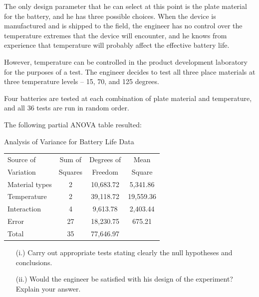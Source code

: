 The only design parameter that he can select at this point is the plate material for the battery, and he has three possible choices. 
When the device is manufactured and is shipped to the field, the engineer has no control over the temperature extremes that the device will encounter, and he knows from experience  that temperature will probably affect the effective battery life. 

However, temperature can be controlled in the product development laboratory for the purposes of a test.  The engineer decides to test all three place materials at three temperature levels – 15, 70, and 125 degrees. 

Four batteries are tested at each combination of plate material and temperature, and all 36 tests are run in random order.


The following partial ANOVA table resulted:

Analysis of Variance for Battery Life Data
\begin{center}
	\begin{tabular}{|l|c|c|c|}\hline
		Source of & Sum of &\phantom{mak} Degrees of \phantom{mak}& Mean \\
		
		Variation & Squares & Freedom  & Square\\
		
		Material types & 2&  10,683.72 & \phantom{mak} 5,341.86\phantom{mak} \\
		
		Temperature & 2& 39,118.72 & 19,559.36\\
		
		Interaction & 4& 9,613.78 & 2,403.44\\
		
		Error &\phantom{mak} 27\phantom{mak}& 18,230.75 & 675.21\\
		
		Total &35&77,646.97 & \\\hline
	\end{tabular} 
\end{center}
\begin{itemize}
	\item[(i.)] Carry out appropriate tests stating clearly the null hypotheses and conclusions. 
	
	\item[(ii.)] Would the engineer be satisfied with his design of the experiment? Explain your answer. 
\end{itemize}


